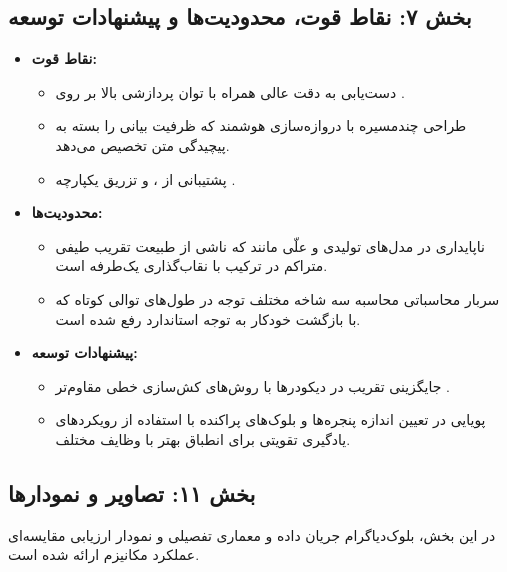 \subsection*{بخش ۷: نقاط قوت، محدودیت‌ها و پیشنهادات توسعه }
\begin{itemize}
    \item \textbf{نقاط قوت:}
    \begin{itemize}
        \item دست‌یابی به دقت عالی  همراه با توان پردازشی بالا  بر روی .
        \item طراحی چندمسیره با دروازه‌سازی هوشمند که ظرفیت بیانی  را بسته به پیچیدگی متن تخصیص می‌دهد.
        \item پشتیبانی از ،  و تزریق یکپارچه .
    \end{itemize}
    \item \textbf{محدودیت‌ها:}
    \begin{itemize}
        \item ناپایداری در مدل‌های تولیدی و علّی مانند  که ناشی از طبیعت تقریب طیفی متراکم در ترکیب با نقاب‌گذاری یک‌طرفه است.
        \item سربار محاسباتی محاسبه سه شاخه مختلف توجه در طول‌های توالی کوتاه که با بازگشت خودکار به توجه استاندارد رفع شده است.
    \end{itemize}
    \item \textbf{پیشنهادات توسعه:}
    \begin{itemize}
        \item جایگزینی تقریب  در دیکودرها با روش‌های کش‌سازی خطی مقاوم‌تر .
        \item پویایی در تعیین اندازه پنجره‌ها و بلوک‌های پراکنده با استفاده از رویکردهای یادگیری تقویتی  برای انطباق بهتر با وظایف مختلف.
    \end{itemize}
\end{itemize}

\subsection*{بخش ۱۱: تصاویر و نمودارها }
در این بخش، بلوک‌دیاگرام جریان داده و معماری تفصیلی و نمودار ارزیابی مقایسه‌ای عملکرد مکانیزم  ارائه شده است.



